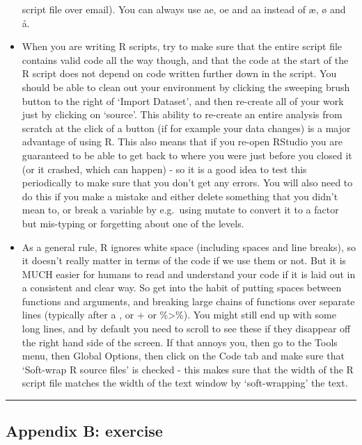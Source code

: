 \documentclass[
]{article}
\begin{document}
\begin{itemize}
  script file over email). You can always use ae, oe and aa instead of
  æ, ø and å.
\item
  When you are writing R scripts, try to make sure that the entire
  script file contains valid code all the way though, and that the code
  at the start of the R script does not depend on code written further
  down in the script. You should be able to clean out your environment
  by clicking the sweeping brush button to the right of `Import
  Dataset', and then re-create all of your work just by clicking on
  `source'. This ability to re-create an entire analysis from scratch at
  the click of a button (if for example your data changes) is a major
  advantage of using R. This also means that if you re-open RStudio you
  are guaranteed to be able to get back to where you were just before
  you closed it (or it crashed, which can happen) - so it is a good idea
  to test this periodically to make sure that you don't get any errors.
  You will also need to do this if you make a mistake and either delete
  something that you didn't mean to, or break a variable by e.g.~using
  mutate to convert it to a factor but mis-typing or forgetting about
  one of the levels.
\item
  As a general rule, R ignores white space (including spaces and line
  breaks), so it doesn't really matter in terms of the code if we use
  them or not. But it is MUCH easier for humans to read and understand
  your code if it is laid out in a consistent and clear way. So get into
  the habit of putting spaces between functions and arguments, and
  breaking large chains of functions over separate lines (typically
  after a , or + or \%\textgreater\%). You might still end up with some
  long lines, and by default you need to scroll to see these if they
  disappear off the right hand side of the screen. If that annoys you,
  then go to the Tools menu, then Global Options, then click on the Code
  tab and make sure that `Soft-wrap R source files' is checked - this
  makes sure that the width of the R script file matches the width of
  the text window by `soft-wrapping' the text.
\end{itemize}

\begin{center}\rule{0.5\linewidth}{0.5pt}\end{center}

\hypertarget{appendix-b-exercise}{%
\subsection{Appendix B: exercise}\label{appendix-b-exercise}}
\end{document}
